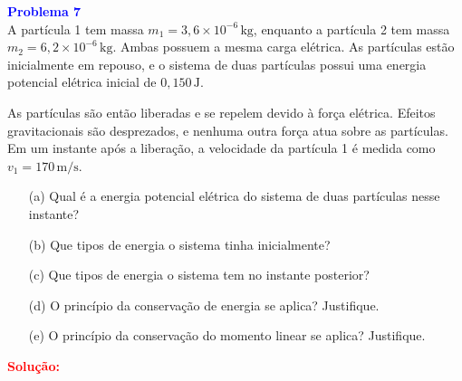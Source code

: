 \documentclass[a4paper,12pt]{article}
\begin{document}
\begin{flushleft}
\textbf{\textcolor{blue}{\Large Problema 7}}\\
A partícula 1 tem massa \( m_1 = 3{,}6 \times 10^{-6} \, \text{kg} \), enquanto a partícula 2 tem 
massa \( m_2 = 6{,}2 \times 10^{-6} \, \text{kg} \). Ambas possuem a mesma carga elétrica. As partículas 
estão inicialmente em repouso, e o sistema de duas partículas possui uma energia potencial elétrica 
inicial de \( 0{,}150 \, \text{J} \).

As partículas são então liberadas e se repelem devido à força elétrica. Efeitos gravitacionais 
são desprezados, e nenhuma outra força atua sobre as partículas. Em um instante após a liberação, a 
velocidade da partícula 1 é medida como \( v_1 = 170 \, \text{m/s} \).

\begin{enumerate}
    \item[(a)] Qual é a energia potencial elétrica do sistema de duas partículas nesse instante?
    \item[(b)] Que tipos de energia o sistema tinha inicialmente?
    \item[(c)] Que tipos de energia o sistema tem no instante posterior?
    \item[(d)] O princípio da conservação de energia se aplica? Justifique.
    \item[(e)] O princípio da conservação do momento linear se aplica? Justifique.
\end{enumerate}

\textcolor{red}{\textbf{Solução:}}\\
\end{flushleft}
\end{document}
